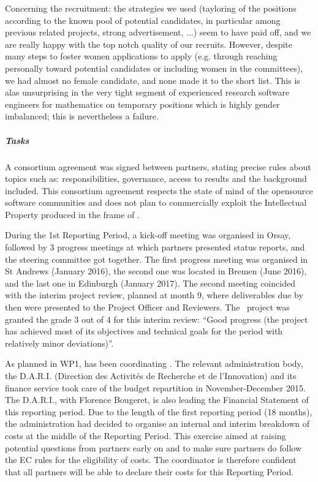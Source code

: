 Concerning the recruitment: the strategies we used (tayloring of the
positions according to the known pool of potential candidates, in
particular among previous related projects, strong advertisement, ...)
seem to have paid off, and we are really happy with the top notch
quality of our recruits. However, despite many steps to foster women
applications to apply (e.g. through reaching personally toward
potential candidates or including women in the committees), we had
almost no female candidate, and none made it to the short list. This
is alas unsurprising in the very tight segment of experienced research
software engineers for mathematics on temporary positions which is
highly gender imbalanced; this is nevertheless a failure.

\subparagraph{Tasks}

\subparagraph{}

A consortium agreement was signed
between partners, stating precise rules about topics such as:
responsibilities, governance, access to results and the background
included.  This consortium agreement respects the state of mind of the opensource software communities and does not plan to commercially exploit the Intellectual Property produced in the frame of \ODK.

During the 1st Reporting Period, a kick-off meeting was organised in Orsay, followed by
3 progress meetings at which partners presented status reports, and
the steering committee got together.  The first progress meeting was
organised in St Andrews (January 2016), the second one was located
in Bremen (June 2016), and the last one in Edinburgh (January 2017). The second meeting coincided with the interim project
review, planned at month 9, where deliverables due by then were
presented to the Project Officer and Reviewers. The \ODK\ project was
granted the grade 3 out of 4 for this interim review: ``Good progress
(the project has achieved most of its objectives and technical goals
for the period with relatively minor deviations)''.

As planned in WP1,  has been coordinating \ODK.  The  relevant administration body, the D.A.R.I. (Direction des Activités de Recherche et de l'Innovation) and its finance service took care of the budget repartition in November-December 2015. The D.A.R.I., with Florence Bougeret, is also leading the Financial Statement of this reporting period. Due to the length of the first reporting period (18 months), the  administration had decided to organise an internal and interim
breakdown of costs at the middle of the Reporting Period. This exercise aimed at raising potential questions
from partners early on and to make sure partners do follow the EC
rules for the eligibility of costs. The coordinator is therefore confident that all partners will be able to declare their costs for this Reporting Period.

